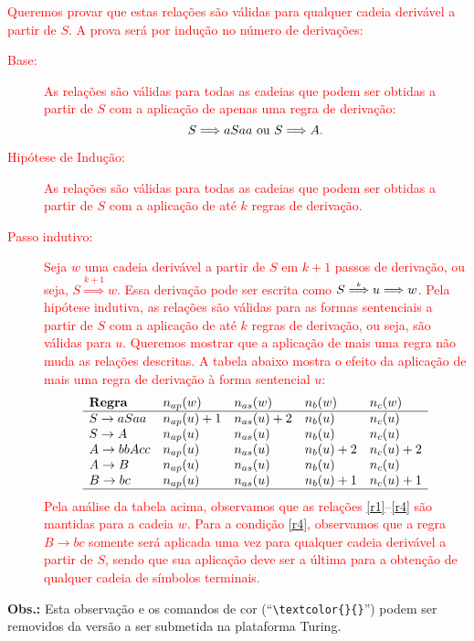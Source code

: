 \documentclass[12pt]{article}
\newcommand{\deriv}[1]{\stackrel{\scriptscriptstyle #1}{\Longrightarrow}}
\begin{document}
\begin{itemize}[leftmargin=3.7cm]
 \textcolor{red}{Queremos provar que estas relações são válidas para qualquer cadeia derivável a partir de $S$. A prova será por indução no número de derivações:
\begin{description}
	\item[Base:] As relações são válidas para todas as cadeias que podem ser obtidas a partir de $S$ com a aplicação de apenas uma regra de derivação: 
	$$S \deriv{} aSaa\text{ ou }S \deriv{} A.$$	
	\item[Hipótese de Indução:] As relações são válidas para todas as cadeias que podem ser obtidas a partir de $S$ com a aplicação de até $k$ regras de derivação.
	\item[Passo indutivo:] Seja $w$ uma cadeia derivável a partir de $S$ em $k+1$ passos de derivação, ou seja, $S \deriv{k+1}w$. Essa derivação pode ser escrita como $S \deriv{k}u \deriv{}w$. Pela hipótese indutiva, as relações são válidas para as formas sentenciais a partir de $S$ com a aplicação de até $k$ regras de derivação, ou seja, são válidas para $u$. Queremos mostrar que a aplicação de mais uma regra não muda as relações descritas. A tabela abaixo mostra o efeito da aplicação de mais uma regra de derivação à forma sentencial $u$:
		$$
		\begin{array}{lllll}
		 \textbf{Regra}           & n_{ap}(w)   & n_{as}(w)   & n_b(w) & n_c(w) \\ 
		\hline
		S \to aSaa  & n_{ap}(u)+1 & n_{as}(u)+2 & n_b(u)   & n_c(u) \\ 
		S \to A     & n_{ap}(u)   & n_{as}(u)   & n_b(u)   & n_c(u) \\ 
		A \to bbAcc & n_{ap}(u)   & n_{as}(u)   & n_b(u)+2 & n_c(u)+2 \\ 
		A \to B     & n_{ap}(u)   & n_{as}(u)   & n_b(u)   & n_c(u) \\ 
		B \to bc    & n_{ap}(u)   & n_{as}(u)   & n_b(u)+1 & n_c(u)+1 \\  
		\hline 
		\end{array} 
		$$
	Pela análise da tabela acima, observamos que as relações \ref{r1}--\ref{r4} são mantidas para a cadeia $w$. Para a condição \ref{r4}, observamos que a regra $B \to bc$ somente será aplicada uma vez para qualquer cadeia derivável a partir de $S$, sendo que sua aplicação deve ser a última para a obtenção de qualquer cadeia de símbolos terminais.
 \end{description}
	}
\end{itemize}
%
%
\noindent\textbf{Obs.:} Esta observação e os comandos de cor (``\verb|\textcolor{}{}|'') podem ser removidos da versão a ser submetida na plataforma Turing.
\end{document}
